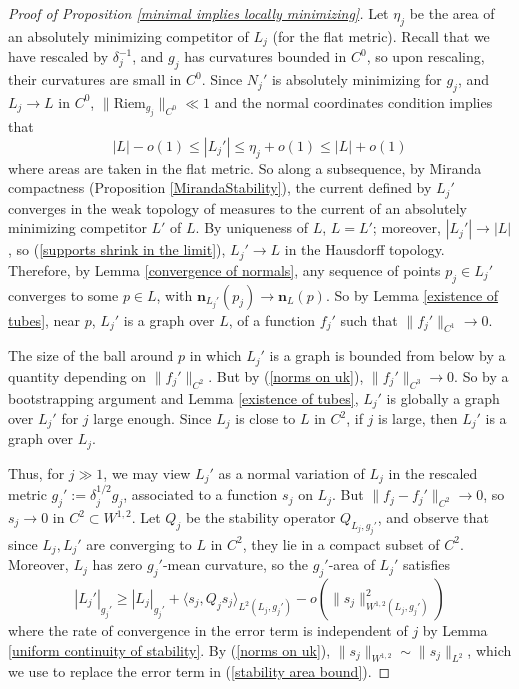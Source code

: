 \documentclass[reqno,11pt]{amsart}
\newcommand{\normal}{\mathbf n}
\newcommand{\Riem}{\mathrm{Riem}}
\theoremstyle{definition}
\numberwithin{equation}{section}
\begin{document}
\begin{proof}[Proof of Proposition \ref{minimal implies locally minimizing}]
Let $\eta_j$ be the area of an absolutely minimizing competitor of $L_j$ (for the flat metric).
Recall that we have rescaled by $\delta_j^{-1}$, and $g_j$ has curvatures bounded in $C^0$, so upon rescaling, their curvatures are small in $C^0$.
Since $N_j'$ is absolutely minimizing for $g_j$, and $L_j \to L$ in $C^0$, $\|\Riem_{g_j}\|_{C^0} \ll 1$ and the normal coordinates condition implies that
$$|L| - o(1) \leq |L_j'| \leq \eta_j + o(1) \leq |L| + o(1)$$
where areas are taken in the flat metric.
So along a subsequence, by Miranda compactness (Proposition \ref{MirandaStability}), the current defined by $L_j'$ converges in the weak topology of measures to the current of an absolutely minimizing competitor $L'$ of $L$.
By uniqueness of $L$, $L = L'$; moreover, $|L_j'| \to |L|$, so (\ref{supports shrink in the limit}), $L_j' \to L$ in the Hausdorff topology.
Therefore, by Lemma \ref{convergence of normals}, any sequence of points $p_j \in L_j'$ converges to some $p \in L$, with $\normal_{L_j'}(p_j) \to \normal_L(p)$.
So by Lemma \ref{existence of tubes}, near $p$, $L_j'$ is a graph over $L$, of a function $f_j'$ such that $\|f_j'\|_{C^1} \to 0$.

The size of the ball around $p$ in which $L_j'$ is a graph is bounded from below by a quantity depending on $\|f_j'\|_{C^2}$.
But by (\ref{norms on uk}), $\|f_j'\|_{C^3} \to 0$.
So by a bootstrapping argument and Lemma \ref{existence of tubes}, $L_j'$ is globally a graph over $L_j'$ for $j$ large enough.
Since $L_j$ is close to $L$ in $C^2$, if $j$ is large, then $L_j'$ is a graph over $L_j$.

Thus, for $j \gg 1$, we may view $L_j'$ as a normal variation of $L_j$ in the rescaled metric $g_j' := \delta_j^{1/2} g_j$, associated to a function $s_j$ on $L_j$.
But $\|f_j - f_j'\|_{C^2} \to 0$, so $s_j \to 0$ in $C^2 \subset W^{1, 2}$.
Let $Q_j$ be the stability operator $Q_{L_j, g_j'}$, and observe that since $L_j, L_j'$ are converging to $L$ in $C^2$, they lie in a compact subset of $C^2$. 
Moreover, $L_j$ has zero $g_j'$-mean curvature, so the $g_j'$-area of $L_j'$ satisfies
\begin{equation}\label{stability area bound}
|L_j'|_{g_j'} \geq |L_j|_{g_j'} + \langle s_j, Q_j s_j\rangle_{L^2(L_j, g_j')} - o(\|s_j\|_{W^{1, 2}(L_j, g_j')}^2)
\end{equation}
where the rate of convergence in the error term is independent of $j$ by Lemma \ref{uniform continuity of stability}.
By (\ref{norms on uk}), $\|s_j\|_{W^{1, 2}} \sim \|s_j\|_{L^2}$, which we use to replace the error term in (\ref{stability area bound}).


\end{proof}
\end{document}
